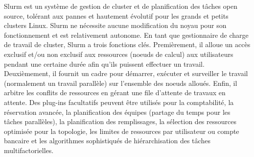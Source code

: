     Slurm est un système de gestion de cluster et de planification des tâches open source, tolérant aux pannes et hautement évolutif pour les grands et petits clusters Linux. Slurm ne nécessite aucune modification du noyau pour son fonctionnement et est relativement autonome. En tant que gestionnaire de charge de travail de cluster, Slurm a trois fonctions clés. Premièrement, il alloue un accès exclusif et/ou non exclusif aux ressources (noeuds de calcul) aux utilisateurs pendant une certaine durée afin qu'ils puissent effectuer un travail. Deuxièmement, il fournit un cadre pour démarrer, exécuter et surveiller le travail (normalement un travail parallèle) sur l'ensemble des noeuds alloués. Enfin, il arbitre les conflits de ressources en gérant une file d'attente de travaux en attente. Des plug-ins facultatifs peuvent être utilisés pour la comptabilité, la réservation avancée, la planification des équipes (partage du temps pour les tâches parallèles), la planification des remplissages, la sélection des ressources optimisée pour la topologie, les limites de ressources par utilisateur ou compte bancaire et les algorithmes sophistiqués de hiérarchisation des tâches multifactorielles.

